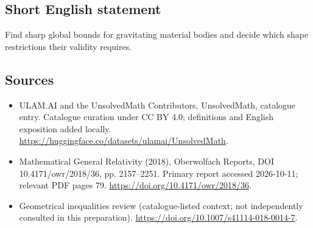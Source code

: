 \documentclass[11pt]{article}
\begin{document}
\subsection{Short English statement}
Find sharp global bounds for gravitating material bodies and decide which shape restrictions their validity requires.
\subsection{Sources}
\begin{itemize}
\item[\hypertarget{source:statement:1}{S1}] ULAM.AI and the UnsolvedMath Contributors, UnsolvedMath, catalogue entry. Catalogue curation under CC BY 4.0; definitions and English exposition added locally.
\url{https://huggingface.co/datasets/ulamai/UnsolvedMath}.
\item[\hypertarget{source:statement:2}{S2}] Mathematical General Relativity (2018), Oberwolfach Reports, DOI 10.4171/owr/2018/36, pp. 2157--2251. Primary report accessed 2026-10-11; relevant PDF pages 79.
\url{https://doi.org/10.4171/owr/2018/36}.
\item[\hypertarget{source:statement:3}{S3}] Geometrical inequalities review (catalogue-listed context; not independently consulted in this preparation).
\url{https://doi.org/10.1007/s41114-018-0014-7}.
\end{itemize}
\label{end:statement}
\end{document}
